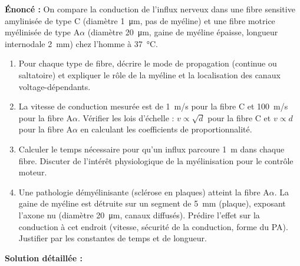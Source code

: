 \documentclass[11pt]{article}
\begin{document}
\begin{exoresolu}
\textbf{Énoncé :} On compare la conduction de l'influx nerveux dans une fibre sensitive amylinisée de type C (diamètre \SI{1}{\micro m}, pas de myéline) et une fibre motrice myélinisée de type A$\alpha$ (diamètre \SI{20}{\micro m}, gaine de myéline épaisse, longueur internodale \SI{2}{mm}) chez l'homme à \SI{37}{\celsius}.

\begin{enumerate}
    \item Pour chaque type de fibre, décrire le mode de propagation (continue ou saltatoire) et expliquer le rôle de la myéline et la localisation des canaux  voltage-dépendants.
    \item La vitesse de conduction mesurée est de \SI{1}{m/s} pour la fibre C et \SI{100}{m/s} pour la fibre A$\alpha$. Vérifier les lois d'échelle : $v \propto \sqrt{d}$ pour la fibre C et $v \propto d$ pour la fibre A$\alpha$ en calculant les coefficients de proportionnalité.
    \item Calculer le temps nécessaire pour qu'un influx parcoure \SI{1}{m} dans chaque fibre. Discuter de l'intérêt physiologique de la myélinisation pour le contrôle moteur.
    \item Une pathologie démyélinisante (sclérose en plaques) atteint la fibre A$\alpha$. La gaine de myéline est détruite sur un segment de \SI{5}{mm} (plaque), exposant l'axone nu (diamètre \SI{20}{\micro m}, canaux  diffusés). Prédire l'effet sur la conduction à cet endroit (vitesse, sécurité de la conduction, forme du PA). Justifier par les constantes de temps et de longueur.
\end{enumerate}

\tcblower
\textbf{Solution détaillée :}


\end{exoresolu}
\end{document}

